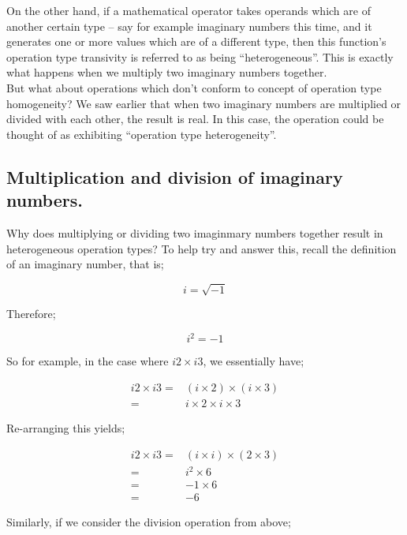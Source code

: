 \documentclass{article}
\begin{document}
On the other hand, if a mathematical operator takes operands which are of another certain type -- say for example 
imaginary numbers this time, and it generates one or more values which are of a different type, then this function's 
operation type transivity is referred to as being ``heterogeneous''. This is exactly what happens when we multiply two
imaginary numbers together.\\

But what about operations which don't conform to concept of operation type homogeneity? We saw earlier that when 
two imaginary numbers are multiplied or divided with each other, the result is real. In this case, the operation
could be thought of as exhibiting ``operation type heterogeneity''.


\subsection{Multiplication and division of imaginary numbers.}

Why does multiplying or dividing two imaginmary numbers together result in heterogeneous operation types?
To help try and answer this, recall the definition of an imaginary number, that is;

\begin{equation*}
i = \sqrt{-1}
\end{equation*}

Therefore;

\begin{equation*}
i^{2} = -1
\end{equation*}

So for example, in the case where $i2 \times i3$, we essentially have;

\begin{align*}
i2 \times i3 =&  (i \times 2) \times (i \times 3) \\
             =&  i \times 2 \times i \times 3
\end{align*}

Re-arranging this yields;

\begin{align*}
i2 \times i3 =&  (i \times i) \times (2 \times 3) \\
             =&  i^{2} \times 6 \\
             =&  -1 \times 6 \\
             =&  -6
\end{align*}

Similarly, if we consider the division operation from above;
\end{document}
